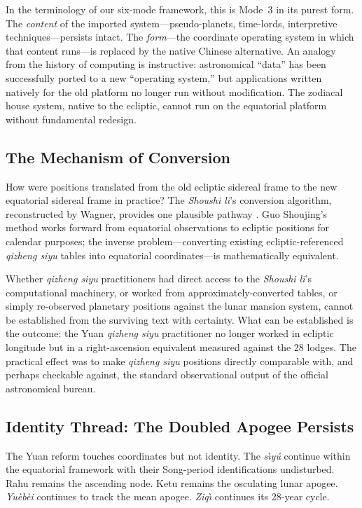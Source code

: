 \documentclass[10pt,a4paper]{article}
\begin{document}
In the terminology of our six-mode framework, this is Mode~3 in its
purest form.  The \emph{content} of the imported system---pseudo-planets,
time-lords, interpretive techniques---persists intact.  The
\emph{form}---the coordinate operating system in which that content
runs---is replaced by the native Chinese alternative.  An analogy
from the history of computing is instructive: astronomical
``data'' has been successfully ported to a new ``operating system,''
but applications written natively for the old platform no longer
run without modification.  The zodiacal house system, native to the
ecliptic, cannot run on the equatorial platform without
fundamental redesign.

\subsection*{The Mechanism of Conversion}

How were positions translated from the old ecliptic sidereal frame
to the new equatorial sidereal frame in practice?  The \textit{Shoushi li}'s
conversion algorithm, reconstructed by Wagner, provides one plausible
pathway \citep{wagner2024gsj}.  Guo Shoujing's method works forward
from equatorial observations to ecliptic positions for calendar
purposes; the inverse problem---converting existing ecliptic-referenced
\textit{qizheng siyu} tables into equatorial coordinates---is mathematically
equivalent.

Whether \textit{qizheng siyu} practitioners had direct access to the
\textit{Shoushi li}'s computational machinery, or worked from
approximately-converted tables, or simply re-observed planetary
positions against the lunar mansion system, cannot be established
from the surviving text with certainty.  What can be established
is the outcome: the Yuan \textit{qizheng siyu} practitioner no longer
worked in ecliptic longitude but in a right-ascension equivalent
measured against the 28 lodges.  The practical effect was to make
\textit{qizheng siyu} positions directly comparable with, and perhaps
checkable against, the standard observational output of the
official astronomical bureau.

\subsection*{Identity Thread: The Doubled Apogee Persists}

The Yuan reform touches coordinates but not identity.  The \textit{s\`{\i}y\'u}
continue within the equatorial framework with their Song-period
identifications undisturbed.  Rahu remains the ascending
node.  Ketu remains the osculating lunar apogee.  \textit{Yu\`eb\`ei}
continues to track the mean apogee.
\textit{Ziq\`{\i}} continues its 28-year cycle.
\end{document}
